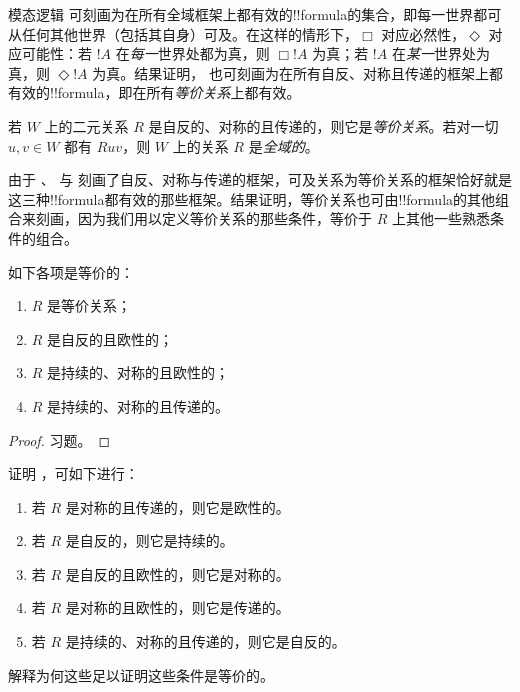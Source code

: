 \documentclass[../../../include/open-logic-section]{subfiles}
\begin{document}


模态逻辑  可刻画为在所有全域框架上都有效的!!{formula}的集合，即每一世界都可从任何其他世界（包括其自身）可及。在这样的情形下，$\Box$ 对应必然性，$\Diamond$ 对应可能性：若 $!A$ 在\emph{每一}世界处都为真，则 $\Box !A$ 为真；若 $!A$ 在\emph{某一}世界处为真，则 $\Diamond !A$ 为真。结果证明， 也可刻画为在所有自反、对称且传递的框架上都有效的!!{formula}，即在所有\emph{等价关系}上都有效。

\begin{defn}
  若 $W$ 上的二元关系 $R$ 是自反的、对称的且传递的，则它是\emph{等价关系}。若对一切 $u,v \in W$ 都有 $Ruv$，则 $W$ 上的关系 $R$ 是\emph{全域的}。
\end{defn}

由于 、 与  刻画了自反、对称与传递的框架，可及关系为等价关系的框架恰好就是这三种!!{formula}都有效的那些框架。结果证明，等价关系也可由!!{formula}的其他组合来刻画，因为我们用以定义等价关系的那些条件，等价于 $R$ 上其他一些熟悉条件的组合。

\begin{prop}
  如下各项是等价的：
  \begin{enumerate}
  \item $R$ 是等价关系；
  \item $R$ 是自反的且欧性的；
  \item $R$ 是持续的、对称的且欧性的；
  \item $R$ 是持续的、对称的且传递的。
  \end{enumerate}
\end{prop}

\begin{proof}
  习题。
\end{proof}

\begin{prob}
  证明 ，可如下进行：
  \begin{enumerate}
  \item 若 $R$ 是对称的且传递的，则它是欧性的。
  \item 若 $R$ 是自反的，则它是持续的。
  \item 若 $R$ 是自反的且欧性的，则它是对称的。
  \item 若 $R$ 是对称的且欧性的，则它是传递的。
  \item 若 $R$ 是持续的、对称的且传递的，则它是自反的。
  \end{enumerate}
  解释为何这些足以证明这些条件是等价的。
\end{prob}
\end{document}
